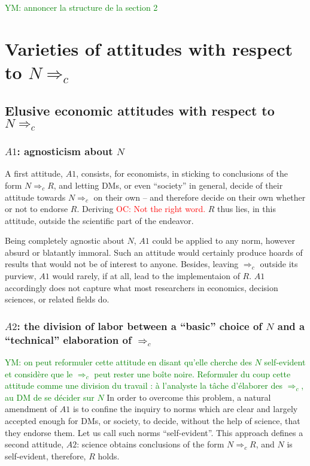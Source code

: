 \documentclass[preprint, french, english, 11pt, authoryear]{elsarticle}%
\newcommand{\protectforpdf}[1]{\texorpdfstring{\ensuremath{#1}}{#1}}
\newcommand{\commentYM}[1]{\textcolor{green}{YM: #1}}
\newcommand{\commentOC}[1]{\textcolor{red}{OC: #1}}
\begin{document}
\commentYM{annoncer la structure de la section 2}
\section{Varieties of attitudes with respect to \protectforpdf{N ⇒_c}}
\label{sec:existing}
\subsection{Elusive economic attitudes with respect to \protectforpdf{N ⇒_c}}
\subsubsection{\protectforpdf{A1}: agnosticism about \protectforpdf{N}}
A first attitude, $A1$, consists, for economists, in sticking to conclusions of the form $N ⇒_c R$, and letting \acp{DM}, or even “society” in general, decide of their attitude towards $N ⇒_c$ on their own -- and therefore decide on their own whether or not to endorse $R$. Deriving \commentOC{Not the right word.} $R$ thus lies, in this attitude, outside the scientific part of the endeavor. 

Being completely agnostic about $N$, $A1$ could be applied to any norm, however absurd or blatantly immoral. Such an attitude would certainly produce hoards of results that would not be of interest to anyone. Besides, leaving $⇒_c$ outside its purview, $A1$ would rarely, if at all, lead to the implementaion of $R$. $A1$ accordingly does not capture what most researchers in economics, decision sciences, or related fields do.

\subsubsection{\protectforpdf{A2}: the division of labor between a ``basic'' choice of \protectforpdf{N} and a ``technical'' elaboration of \protectforpdf{⇒_c}}\commentYM{on peut reformuler cette attitude en disant qu'elle cherche des $N$ self-evident et considère que le $⇒_c$ peut rester une boîte noire. Reformuler du coup cette attitude comme une division du travail : à l'analyste la tâche d'élaborer des $⇒_c$, au DM de se décider sur $N$}
In order to overcome this problem, a natural amendment of $A1$ is to confine the inquiry to norms which are clear and largely accepted enough for \acp{DM}, or society, to decide, without the help of science, that they endorse them. Let us call such norms “self-evident”.
This approach defines a second attitude, $A2$: science obtains conclusions of the form $N ⇒_c R$, and $N$ is self-evident, therefore, $R$ holds.
\end{document}

